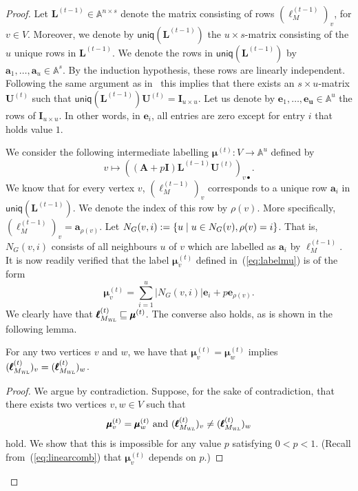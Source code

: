 \begin{proof}
{Let $\mathbf{L}^{(t-1)}\in\mathbb{A}^{n\times s}$ denote the matrix consisting of rows $(\pmb{\ell}_M^{(t-1)})_v$, for $v\in V$.
Moreover, we denote by $\mathsf{uniq}(\mathbf{L}^{(t-1)})$ the $u\times s$-matrix consisting of the $u$ unique rows in $\mathbf{L}^{(t-1)}$. We denote the rows in $\mathsf{uniq}(\mathbf{L}^{(t-1)})$ by $\mathbf{a}_1,\ldots,\mathbf{a}_u\in\mathbb{A}^s$.
By the induction hypothesis, these rows are linearly independent. Following the same argument as in~\cite{grohewl} this implies that there exists an $s\times u$-matrix $\mathbf{U}^{(t)}$ such that $\mathsf{uniq}(\mathbf{L}^{(t-1)})\mathbf{U}^{(t)}=\mathbf{I}_{u\times u}$. 
Let us denote by $\mathbf{e}_1,\ldots,\mathbf{e_u}\in\mathbb{A}^u$ the rows of $\mathbf{I}_{u\times u}$. In other words, in $\mathbf{e}_i$, all entries are zero except for entry $i$ that holds value $1$. 

We consider the following intermediate labelling $\pmb{\mu}^{(t)}:V\to\mathbb{A}^u$ defined by
\begin{equation}
v\mapsto \left((\mathbf{A}+p\mathbf{I})\mathbf{L}^{(t-1)}\mathbf{U}^{(t)}\right)_{v\bullet}.\label{eq:labelmu}
\end{equation}
We know that for every vertex $v$, $(\pmb{\ell}_M^{(t-1)})_v$ corresponds to a unique row $\mathbf{a}_i$ in $\mathsf{uniq}(\mathbf{L}^{(t-1)})$. We denote the index of this row by $\rho(v)$. More specifically, $(\pmb{\ell}_M^{(t-1)})_v=\mathbf{a}_{\rho(v)}$. Let
$N_G(v,i):=\{u \mathrel{\mid} u\in N_G(v), \rho(v)=i\}$. That is, $N_G(v,i)$ consists of all neighbours $u$ of $v$ which are labelled as $\mathbf{a}_i$ by $\pmb{\ell}_M^{(t-1)}$.
It is now readily verified that the label $\pmb{\mu}^{(t)}_v$ defined in~(\ref{eq:labelmu}) is of the form 
\begin{equation}
\pmb{\mu}^{(t)}_v=\sum_{i=1}^u |N_G(v,i)|\mathbf{e}_i + p\mathbf{e}_{\rho(v)}.  \label{eq:linearcomb}
\end{equation}
We clearly have that $\pmb{\ell}_{M_{\textsl{WL}}}^{(t)}\sqsubseteq\pmb{\mu}^{(t)}$.
The converse also holds, as is shown in the following lemma.
\begin{lemma}
For any two vertices $v$ and $w$, we have that 
	$\pmb{\mu}^{(t)}_v=\pmb{\mu}^{(t)}_w$ implies 
	$(\pmb{\ell}_{M_{\textsl{WL}}}^{(t)})_v=(\pmb{\ell}_{M_{\textsl{WL}}}^{(t)})_w$.
\end{lemma}
\begin{proof}
We argue by contradiction. Suppose, for the sake of contradiction, that there exists two vertices $v,w\in V$ such that 
	\begin{equation}
		\pmb{\mu}^{(t)}_{v}=\pmb{\mu}^{(t)}_{w} \text{ and } (\pmb{\ell}_{M_{\textsl{WL}}}^{(t)})_v\neq(\pmb{\ell}_{M_{\textsl{WL}}}^{(t)})_w \label{eq:contra}
	\end{equation}
	hold.
We show that this is impossible for any value $p$ satisfying $0<p<1$. (Recall from~(\ref{eq:linearcomb}) that $\pmb{\mu}^{(t)}_v$ depends on $p$.)


\end{proof}}
\end{proof}
